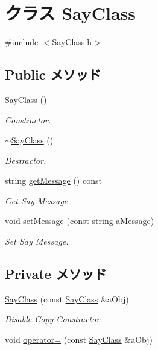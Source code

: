 \hypertarget{classSayClass}{\section{クラス \-Say\-Class}
\label{classSayClass}
}


{\ttfamily \#include $<$\-Say\-Class.\-h$>$}

\subsection*{\-Public メソッド}
\begin{DoxyCompactItemize}
\item 
\hyperlink{classSayClass_ac9fb8db5cd217f8e5123fbe8043f9007}{\-Say\-Class} ()
\begin{DoxyCompactList}\small\item\em \-Constractor. \end{DoxyCompactList}\item 
\hyperlink{classSayClass_a54d89f97051256c5ba31c19e03ed3418}{$\sim$\-Say\-Class} ()
\begin{DoxyCompactList}\small\item\em \-Destractor. \end{DoxyCompactList}\item 
string \hyperlink{classSayClass_a619e0ee356f9c04aa79ef11a8a3965fd}{get\-Message} () const 
\begin{DoxyCompactList}\small\item\em \-Get \-Say \-Message. \end{DoxyCompactList}\item 
void \hyperlink{classSayClass_afb4d7ea98d95e9b9eba553cc8aca4dd7}{set\-Message} (const string a\-Message)
\begin{DoxyCompactList}\small\item\em \-Set \-Say \-Message. \end{DoxyCompactList}\end{DoxyCompactItemize}
\subsection*{\-Private メソッド}
\begin{DoxyCompactItemize}
\item 
\hyperlink{classSayClass_acf487fb2d4c4d76cd509212b42170763}{\-Say\-Class} (const \hyperlink{classSayClass}{\-Say\-Class} \&a\-Obj)
\begin{DoxyCompactList}\small\item\em \-Disable \-Copy \-Constractor. \end{DoxyCompactList}\item 
void \hyperlink{classSayClass_a02e6b50715d6f1a0633c6436d1779659}{operator=} (const \hyperlink{classSayClass}{\-Say\-Class} \&a\-Obj)
\end{DoxyCompactItemize}
